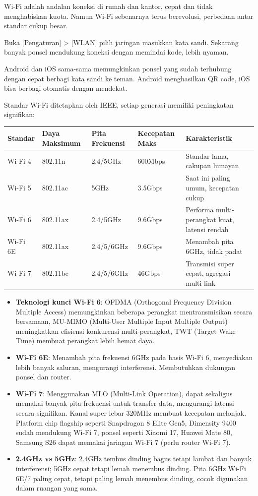 Wi-Fi adalah andalan koneksi di rumah dan kantor, cepat dan tidak menghabiskan kuota. Namun Wi-Fi sebenarnya terus berevolusi, perbedaan antar standar cukup besar.


Buka [Pengaturan] > [WLAN] pilih jaringan masukkan kata sandi. Sekarang banyak ponsel mendukung koneksi dengan memindai kode, lebih nyaman.


Android dan iOS sama-sama memungkinkan ponsel yang sudah terhubung dengan cepat berbagi kata sandi ke teman. Android menghasilkan QR code, iOS bisa berbagi otomatis dengan mendekat.


Standar Wi-Fi ditetapkan oleh IEEE, setiap generasi memiliki peningkatan signifikan:

\begin{center}
\begin{tabularx}{\linewidth}{|X|X|X|X|X|}
\hline
\textbf{Standar} & \textbf{Daya Maksimum} & \textbf{Pita Frekuensi} & \textbf{Kecepatan Maks} & \textbf{Karakteristik} \tabularnewline
\hline
Wi-Fi 4 & 802.11n & 2.4/5GHz & 600Mbps & Standar lama, cakupan lumayan \tabularnewline
Wi-Fi 5 & 802.11ac & 5GHz & 3.5Gbps & Saat ini paling umum, kecepatan cukup \tabularnewline
Wi-Fi 6 & 802.11ax & 2.4/5GHz & 9.6Gbps & Performa multi-perangkat kuat, latensi rendah \tabularnewline
Wi-Fi 6E & 802.11ax & 2.4/5/6GHz & 9.6Gbps & Menambah pita 6GHz, tidak padat \tabularnewline
Wi-Fi 7 & 802.11be & 2.4/5/6GHz & 46Gbps & Transmisi super cepat, agregasi multi-link \tabularnewline
\hline
\end{tabularx}
\end{center}

\begin{itemize}
  \item \textbf{Teknologi kunci Wi-Fi 6}: OFDMA (Orthogonal Frequency Division Multiple Access) memungkinkan beberapa perangkat mentransmisikan secara bersamaan, MU-MIMO (Multi-User Multiple Input Multiple Output) meningkatkan efisiensi konkurensi multi-perangkat, TWT (Target Wake Time) membuat perangkat lebih hemat daya.
  \item \textbf{Wi-Fi 6E}: Menambah pita frekuensi 6GHz pada basis Wi-Fi 6, menyediakan lebih banyak saluran, mengurangi interferensi. Membutuhkan dukungan ponsel dan router.
  \item \textbf{Wi-Fi 7}: Menggunakan MLO (Multi-Link Operation), dapat sekaligus memakai banyak pita frekuensi untuk transfer data, mengurangi latensi secara signifikan. Kanal super lebar 320MHz membuat kecepatan melonjak. Platform chip flagship seperti Snapdragon 8 Elite Gen5, Dimensity 9400 sudah mendukung Wi-Fi 7, ponsel seperti Xiaomi 17, Huawei Mate 80, Samsung S26 dapat memakai jaringan Wi-Fi 7 (perlu router Wi-Fi 7).
  \item \textbf{2.4GHz vs 5GHz}: 2.4GHz tembus dinding bagus tetapi lambat dan banyak interferensi; 5GHz cepat tetapi lemah menembus dinding. Pita 6GHz Wi-Fi 6E/7 paling cepat, tetapi paling lemah menembus dinding, cocok digunakan dalam ruangan yang sama.
\end{itemize}

